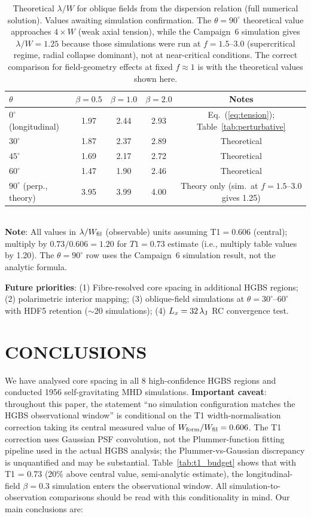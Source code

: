 \documentclass[twoside,twocolumn]{mnras}
\begin{document}
\begin{table}
\caption{Theoretical $\lambda/W$ for oblique fields from the \citet{Nakamura1993} dispersion relation (full numerical solution). Values awaiting simulation confirmation. The $\theta=90^\circ$ theoretical value approaches $4\times W$ (weak axial tension), while the Campaign~6 simulation gives $\lambda/W=1.25$ because those simulations were run at $f=1.5$--$3.0$ (supercritical regime, radial collapse dominant), not at near-critical conditions. The correct comparison for field-geometry effects at fixed $f\approx 1$ is with the theoretical values shown here.}
\label{tab:oblique_theory}
\small
\begin{tabular}{lcccc}
\toprule
$\theta$ & $\beta=0.5$ & $\beta=1.0$ & $\beta=2.0$ & Notes \\
\midrule
$0^\circ$ (longitudinal) & 1.97 & 2.44 & 2.93 & Eq.~(\ref{eq:tension}); Table~\ref{tab:perturbative} \\
$30^\circ$ & 1.87 & 2.37 & 2.89 & Theoretical \\
$45^\circ$ & 1.69 & 2.17 & 2.72 & Theoretical \\
$60^\circ$ & 1.47 & 1.90 & 2.46 & Theoretical \\
$90^\circ$ (perp., theory) & 3.95 & 3.99 & 4.00 & Theory only (sim.\ at $f=1.5$--$3.0$ gives 1.25) \\
\bottomrule
\end{tabular}
\\ \footnotesize \textbf{Note}: All values in $\lambda/W_{\rm fil}$ (observable) units assuming T1$=0.606$ (central); multiply by $0.73/0.606 = 1.20$ for $T1=0.73$ estimate (i.e., multiply table values by 1.20). The $\theta=90^\circ$ row uses the Campaign~6 simulation result, not the analytic formula.
\end{table}

\textbf{Future priorities}: (1) Fibre-resolved core spacing in additional HGBS regions; (2) polarimetric interior mapping; (3) oblique-field simulations at $\theta = 30^\circ$--$60^\circ$ with HDF5 retention ($\sim$20 simulations); (4) $L_x = 32\,\lambda_{\rm J}$ RC convergence test.

\section{CONCLUSIONS}

We have analysed core spacing in all 8 high-confidence HGBS regions and conducted
1956 self-gravitating MHD simulations. \textbf{Important caveat}: throughout this
paper, the statement ``no simulation configuration matches the HGBS observational
window'' is conditional on the T1 width-normalisation correction taking its central
measured value of $W_{\rm form}/W_{\rm fil} = 0.606$. The T1 correction uses Gaussian
PSF convolution, not the Plummer-function fitting pipeline used in the actual HGBS
analysis; the Plummer-vs-Gaussian discrepancy is unquantified and may be substantial.
Table~\ref{tab:t1_budget} shows that with T1 = 0.73 (20\% above central value, semi-analytic estimate), the longitudinal-field $\beta = 0.3$ simulation enters the observational window. All
simulation-to-observation comparisons should be read with this conditionality in mind.
Our main conclusions are:
\end{document}
